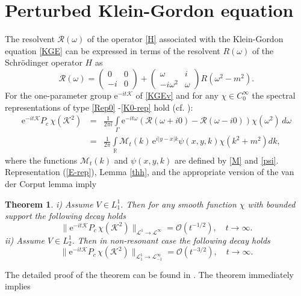 \documentclass[reqno]{amsart}
\newtheorem{theorem}{Theorem}[section]
\newcommand{\R}{{\mathbb R}}
\newcommand{\cL}{{\mathcal L}}
\newcommand{\cR}{{\mathcal R}}
\newcommand{\cK}{{\mathcal K}}
\newcommand{\E}{\mathrm{e}}
\numberwithin{equation}{section}
\begin{document}
\section{Perturbed Klein-Gordon equation}\label{KGP}
The resolvent $\cR(\omega)$ of the operator \eqref{H} associated with the Klein-Gordon equation \eqref{KGE} can be expressed 
in terms of the resolvent   $R(\omega)$ of the Schr\"odinger operator $H$ as
\begin{equation}\label{R}
 \cR(\omega)=
   \begin{pmatrix}
 0            &  0\\
  -i          &  0
\end{pmatrix}
+
\begin{pmatrix}
 \omega &  i \\
  -i \omega^2&  \omega
\end{pmatrix} R(\omega^2-m^2).
\end{equation}
For the one-parameter group $\E^{-it\cK}$ of \eqref{KGEv} and for any $\chi \in C_0^\infty$ 
the spectral representations of type \eqref{Rep0} -\eqref{K0-rep} hold (cf. \cite [Formula (5.4)]{EKTM}):
\begin{eqnarray}\nonumber
\E^{- it\cK}P_c\,\chi (\cK^2)\, 
&=&\frac 1{2\pi i}\int\limits_\Gamma  \E^{-it\omega}  ( \cR(\omega+i0)- \cR(\omega-i0))\chi(\omega^2)\,d\omega\\
\label{E-rep}
&=&\frac{1}{2\pi}\int\limits_{\R}{\mathcal M}_t(k)\,\E^{i|y-x|k}\psi(x,y,k) \chi(k^2+m^2)dk,
\end{eqnarray}
where the functions ${\mathcal M}_t(k)$ and $\psi(x,y,k)$ are defined by \eqref{M} and \eqref{psi}.
Representation (\ref{E-rep}), Lemma \ref{thh}, and the appropriate version of the  van der Corput lemma 
\cite[Lemma 5.4]{EKTM} imply   
\begin{theorem}\label{thKG1}  
i) Assume $V\in L^1_1$. Then for any smooth function $\chi$  with bounded support the following decay holds
\[
\big\| \E^{-it\cK}P_c\,\chi(\cK^2)\big\|_{\cL^1\to \cL^\infty}
={\mathcal O}(t^{-1/2}),\quad t\to \infty.
\]
ii)
Assume $V\in L^1_2$. Then in non-resonant case  the following decay holds
\[
\big\| \E^{-it\cK}P_c\,\chi(\cK^2)\big\|_{ \cL^1_1\to \cL^\infty_{-1}}
={\mathcal O}(t^{-3/2}),\quad t\to \infty.
\]
\end{theorem}
The detailed proof of the theorem can be found in \cite{EKTM}. The theorem immediately implies
\end{document}
